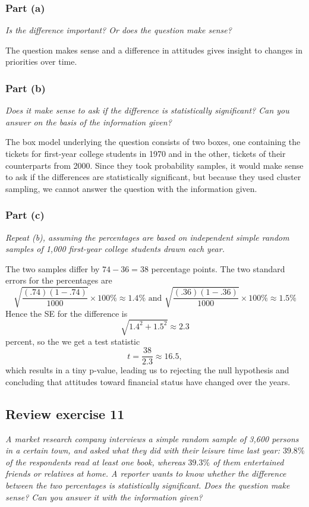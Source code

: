 \documentclass[11pt]{article}
\begin{document}
\subsubsection*{Part (a)}
\textit{Is the difference important?
Or does the question make sense?}

\vspace{5mm}

The question makes sense and a difference in attitudes gives insight to changes in priorities over time.

\subsubsection*{Part (b)}
\textit{Does it make sense to ask if the difference is statistically significant?
Can you answer on the basis of the information given?}

\vspace{5mm}

The box model underlying the question consists of two boxes, one containing the tickets for first-year college students in 1970 and in the other, tickets of their counterparts from 2000.  
Since they took probability samples, it would make sense to ask if the differences are statistically significant, but because they used cluster sampling, we cannot answer the question with the information given.

\subsubsection*{Part (c)}
\textit{Repeat (b), assuming the percentages are based on independent simple random samples of 1,000 first-year college students drawn each year.}

\vspace{5mm}

The two samples differ by $ 74-36=38 $ percentage points. 
The two standard errors for the percentages are $$ \sqrt{\frac{(.74)(1-.74)}{1000}} \times 100\% \approx 1.4\%  \text{ and } \sqrt{\frac{(.36)(1-.36)}{1000}} \times 100\%  \approx 1.5\% $$ 
Hence the SE for the difference is $$ \sqrt{1.4^2 + 1.5^2} \approx 2.3 $$ percent, so the we get a test statistic $$ t = \dfrac{38}{2.3} \approx 16.5, $$ which results in a tiny p-value, leading us to rejecting the null hypothesis and concluding that attitudes toward financial status have changed over the years.

\subsection*{Review exercise 11} %
\textit{A market research company interviews a simple random sample of 3,600 persons in a certain town, and asked what they did with their leisure time last year:
$ 39.8\% $ of the respondents read at least one book, whereas $ 39.3\% $ of them entertained friends or relatives at home.
A reporter wants to know whether the difference between the two percentages is statistically significant.
Does the question make sense?
Can you answer it with the information given?}
\end{document}
